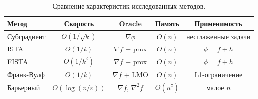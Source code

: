 \documentclass[a4paper,12pt]{article}
\begin{document}
\begin{table}[H]
\centering
\begin{tabular}{|l|c|c|c|c|}
\hline
\textbf{Метод} & \textbf{Скорость} & \textbf{Oracle} & \textbf{Память} & \textbf{Применимость} \\
\hline
Субградиент & $O(1/\sqrt{k})$ & $\nabla \phi$ & $O(n)$ & несглаженные задачи \\
ISTA & $O(1/k)$ & $\nabla f$ + prox & $O(n)$ & $\phi = f + h$ \\
FISTA & $O(1/k^2)$ & $\nabla f$ + prox & $O(n)$ & $\phi = f + h$ \\
Франк-Вулф & $O(1/k)$ & $\nabla f$ + LMO & $O(n)$ & L1-ограничение \\
Барьерный & $O(\log(n/\varepsilon))$ & $\nabla f$, $\nabla^2 f$ & $O(n^2)$ & малое $n$ \\
\hline
\end{tabular}
\caption{Сравнение характеристик исследованных методов.}
\end{table}
\end{document}
